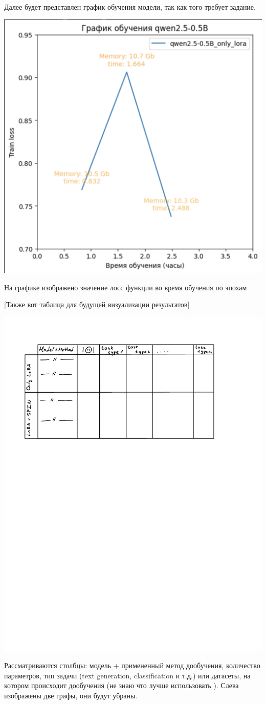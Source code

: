 \documentclass[12pt, twoside]{article}
\begin{document}
Далее будет представлен график обучения модели, так как того требует задание.

\includegraphics[scale=0.5]{images/qwen_training.pdf}

На графике изображено значение лосс функции во время обучения по эпохам

[Также вот таблица для будущей визуализации результатов]

\includegraphics{images/table_draft.pdf}

Рассматриваются столбцы: модель + примененный метод дообучения, количество параметров, тип задачи (text generation, classification и т.д.) или датасеты, на котором происходит дообучения (не знаю что лучше использовать ). Слева изображены две графы, они будут убраны.

\printbibliography
\end{document}
